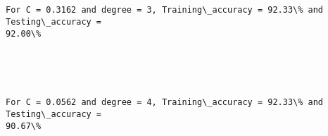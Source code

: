 \documentclass[11pt]{article}
\begin{document}
    \begin{center}
    \end{center}
    { \hspace*{\fill} \\}
    
    \begin{center}
    \end{center}
    { \hspace*{\fill} \\}
    
    \begin{Verbatim}[commandchars=\\\{\}]
For C = 0.3162 and degree = 3, Training\_accuracy = 92.33\% and Testing\_accuracy =
92.00\%
    \end{Verbatim}

    \begin{center}
    \end{center}
    { \hspace*{\fill} \\}
    
    \begin{center}
    \end{center}
    { \hspace*{\fill} \\}
    
    \begin{Verbatim}[commandchars=\\\{\}]
For C = 0.0562 and degree = 4, Training\_accuracy = 92.33\% and Testing\_accuracy =
90.67\%
    \end{Verbatim}

    \begin{center}
    \end{center}
    { \hspace*{\fill} \\}
    
    \begin{center}
    \end{center}
    { \hspace*{\fill} \\}
    
\end{document}
